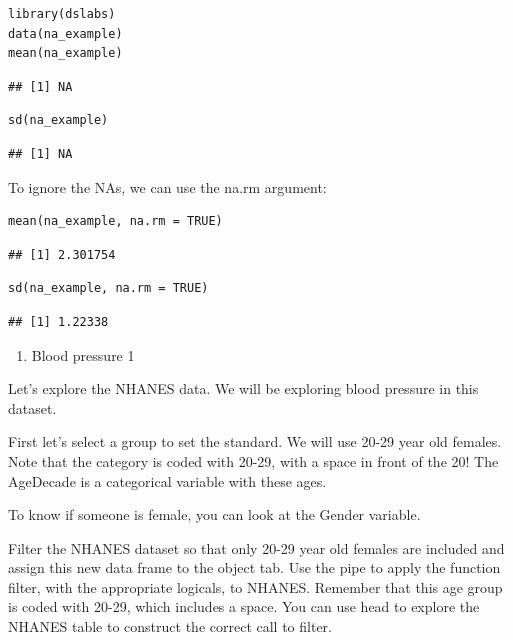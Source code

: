 \documentclass[
]{article}
\providecommand{\tightlist}{%
  \setlength{\itemsep}{0pt}\setlength{\parskip}{0pt}}
\begin{document}
\begin{verbatim}
library(dslabs)
data(na_example)
mean(na_example)
\end{verbatim}

\begin{verbatim}
## [1] NA
\end{verbatim}

\begin{verbatim}
sd(na_example)
\end{verbatim}

\begin{verbatim}
## [1] NA
\end{verbatim}

To ignore the NAs, we can use the na.rm argument:

\begin{verbatim}
mean(na_example, na.rm = TRUE)
\end{verbatim}

\begin{verbatim}
## [1] 2.301754
\end{verbatim}

\begin{verbatim}
sd(na_example, na.rm = TRUE)
\end{verbatim}

\begin{verbatim}
## [1] 1.22338
\end{verbatim}

\begin{enumerate}
\def\labelenumi{\arabic{enumi}.}
\tightlist
\item
  Blood pressure 1
\end{enumerate}

Let's explore the NHANES data. We will be exploring blood pressure in
this dataset.

First let's select a group to set the standard. We will use 20-29 year
old females. Note that the category is coded with 20-29, with a space in
front of the 20! The AgeDecade is a categorical variable with these
ages.

To know if someone is female, you can look at the Gender variable.

Filter the NHANES dataset so that only 20-29 year old females are
included and assign this new data frame to the object tab. Use the pipe
to apply the function filter, with the appropriate logicals, to NHANES.
Remember that this age group is coded with 20-29, which includes a
space. You can use head to explore the NHANES table to construct the
correct call to filter.
\end{document}
